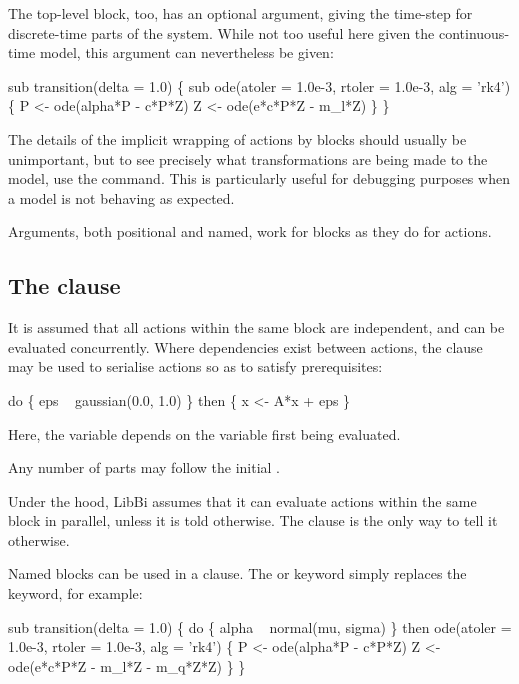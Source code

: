 The top-level  block, too, has an optional argument,
giving the time-step for discrete-time parts of the system. While not too
useful here given the continuous-time model, this argument can nevertheless be
given:
\begin{bicode}
sub transition(delta = 1.0) \{
  sub ode(atoler = 1.0e-3, rtoler = 1.0e-3, alg = 'rk4') \{
    P <- ode(alpha*P - c*P*Z)
    Z <- ode(e*c*P*Z - m_l*Z)
  \}
\}
\end{bicode}

\begin{tip}
The details of the implicit wrapping of actions by blocks should usually be
unimportant, but to see precisely what transformations are being made to the
model, use the  command. This is particularly useful for
debugging purposes when a model is not behaving as expected.
\end{tip}

Arguments, both positional and named, work for blocks as they do for actions.

\subsection{The  clause\label{do_then}}

It is assumed that all actions within the same block are independent, and can
be evaluated concurrently. Where dependencies exist between actions, the
 clause may be used to serialise actions so
as to satisfy prerequisites:
\begin{bicode}
do \{
  eps ~ gaussian(0.0, 1.0)
\} then \{
  x <- A*x + eps
\}
\end{bicode}
Here, the variable  depends on the variable  first being
evaluated.

Any number of  parts may follow the initial .

Under the hood, LibBi assumes that it can evaluate actions within the same block
in parallel, unless it is told otherwise. The  clause is the
only way to tell it otherwise.

Named blocks can be used in a  clause. The  or
 keyword simply replaces the  keyword, for example:
\begin{bicode}
sub transition(delta = 1.0) \{
  do \{
    alpha ~ normal(mu, sigma)
  \} then ode(atoler = 1.0e-3, rtoler = 1.0e-3, alg = 'rk4') \{
    P <- ode(alpha*P - c*P*Z)
    Z <- ode(e*c*P*Z - m_l*Z - m_q*Z*Z)
  \}
\}
\end{bicode}

